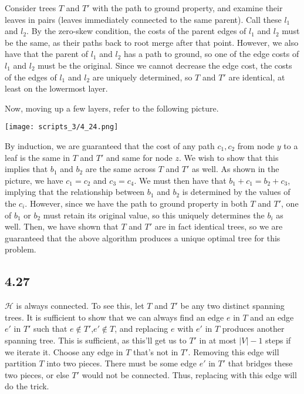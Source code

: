 \documentclass{article}
\begin{document}
Consider trees $T$ and $T'$ with the path to ground property, and examine their leaves in pairs (leaves immediately connected to the same parent). Call these $l_1$ and $l_2$. By the zero-skew condition, the costs of the parent edges of $l_1$ and $l_2$ must be the same, as their paths back to root merge after that point. However, we also have that the parent of $l_1$ and $l_2$ has a path to ground, so one of the edge costs of $l_1$ and $l_2$ must be the original. Since we cannot decrease the edge cost, the costs of the edges of $l_1$ and $l_2$ are uniquely determined, so $T$ and $T'$ are identical, at least on the lowermost layer.

Now, moving up a few layers, refer to the following picture.

\texttt{[image: scripts\_3/4\_24.png]}

By induction, we are guaranteed that the cost of any path $c_1,c_2$ from node $y$ to a leaf is the same in $T$ and $T'$ and same for node $z$. We wish to show that this implies that $b_1$ and $b_2$ are the same across $T$ and $T'$ as well. As shown in the picture, we have $c_1=c_2$ and $c_3=c_4$. We must then have that $b_1+c_1=b_2+c_3$, implying that the relationship between $b_1$ and $b_2$ is determined by the values of the $c_i$. However, since we have the path to ground property in both $T$ and $T'$, one of $b_1$ or $b_2$ must retain its original value, so this uniquely determines the $b_i$ as well. Then, we have shown that $T$ and $T'$ are in fact identical trees, so we are guaranteed that the above algorithm produces a unique optimal tree for this problem.

\subsection*{4.27}
$\mathcal{H}$ is always connected. To see this, let $T$ and $T'$ be any two distinct spanning trees. It is sufficient to show that we can always find an edge $e$ in $T$ and an edge $e'$ in $T'$ such that $e\not\in T'$,$e'\not\in T$, and replacing $e$ with $e'$ in $T$ produces another spanning tree. This is sufficient, as this'll get us to $T'$ in at most $|V|-1$ steps if we iterate it. Choose any edge in $T$ that's not in $T'$. Removing this edge will partition $T$ into two pieces. There must be some edge $e'$ in $T'$ that bridges these two pieces, or else $T'$ would not be connected. Thus, replacing with this edge will do the trick.
\end{document}

